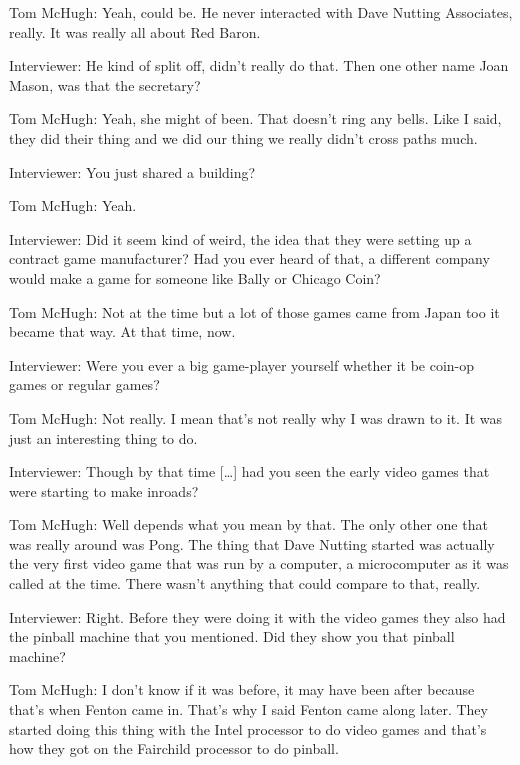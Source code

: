 \textcolor{interviewee}{Tom McHugh:} Yeah, could be. He never interacted with Dave Nutting Associates, really. It was really all about Red Baron.

\textcolor{interviewer}{Interviewer:} He kind of split off, didn’t really do that. Then one other name Joan Mason, was that the secretary?

\textcolor{interviewee}{Tom McHugh:} Yeah, she might of been. That doesn’t ring any bells. Like I said, they did their thing and we did our thing we really didn’t cross paths much.

\textcolor{interviewer}{Interviewer:} You just shared a building?

\textcolor{interviewee}{Tom McHugh:} Yeah.

\textcolor{interviewer}{Interviewer:} Did it seem kind of weird, the idea that they were setting up a contract game manufacturer? Had you ever heard of that, a different company would make a game for someone like Bally or Chicago Coin?

\textcolor{interviewee}{Tom McHugh:} Not at the time but a lot of those games came from Japan too it became that way. At that time, now.

\textcolor{interviewer}{Interviewer:} Were you ever a big game-player yourself whether it be coin-op games or regular games?

\textcolor{interviewee}{Tom McHugh:} Not really. I mean that’s not really why I was drawn to it. It was just an interesting thing to do.

\textcolor{interviewer}{Interviewer:} Though by that time […] had you seen the early video games that were starting to make inroads?

\textcolor{interviewee}{Tom McHugh:} Well depends what you mean by that. The only other one that was really around was Pong. The thing that Dave Nutting started was actually the very first video game that was run by a computer, a microcomputer as it was called at the time. There wasn’t anything that could compare to that, really.

\textcolor{interviewer}{Interviewer:} Right. Before they were doing it with the video games they also had the pinball machine that you mentioned. Did they show you that pinball machine?

\textcolor{interviewee}{Tom McHugh:} I don’t know if it was before, it may have been after because that’s when Fenton came in. That’s why I said Fenton came along later. They started doing this thing with the Intel processor to do video games and that’s how they got on the Fairchild processor to do pinball.

